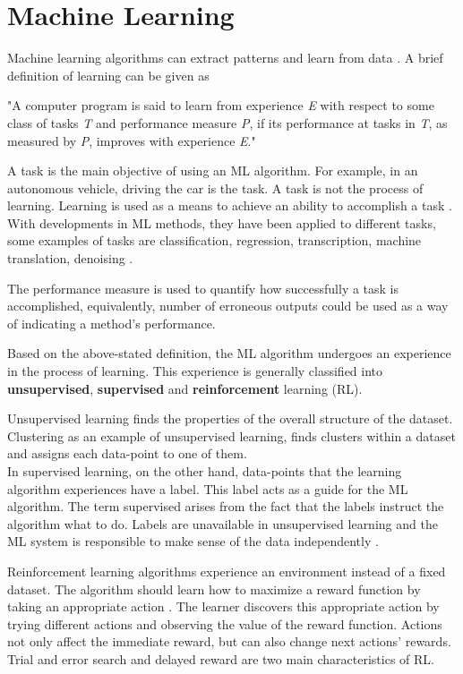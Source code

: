 \chapter{Machine Learning}
Machine learning algorithms can extract patterns and learn from data \cite{IanGoodfellow2016}. A brief definition of learning can be given as \cite{mitchell1997machine}
\begin{displayquote}[][]
    "A computer program is said to learn from experience \textit{E} with respect to some class of tasks \textit{T} and performance measure \textit{P}, if its performance at tasks in \textit{T}, as measured by \textit{P}, improves with experience \textit{E}."
\end{displayquote}

A task is the main objective of using an ML algorithm. For example, in an autonomous vehicle, driving the car is the task. A task is not the process of learning. Learning is used as a means to achieve an ability to accomplish a task \cite{IanGoodfellow2016}. With developments in ML methods, they have been applied to different tasks, some examples of tasks are classification, regression, transcription, machine translation, denoising \cite{IanGoodfellow2016}.

The performance measure is used to quantify how successfully a task is accomplished, equivalently, number of erroneous outputs could be used as a way of indicating a method's performance. 

Based on the above-stated definition, the ML algorithm undergoes an experience in the process of learning. This experience is generally classified into \textbf{unsupervised}, \textbf{supervised} and \textbf{reinforcement} learning (RL).

Unsupervised learning finds the properties of the overall structure of the dataset. Clustering as an example of unsupervised learning, finds clusters within a dataset and assigns each data-point to one of them.\\In supervised learning, on the other hand, data-points that the learning algorithm experiences have a label. This label acts as a guide for the ML algorithm. The term supervised arises from the fact that the labels instruct the algorithm what to do. Labels are unavailable in unsupervised learning and the ML system is responsible to make sense of the data independently \cite{IanGoodfellow2016}. 

Reinforcement learning algorithms experience an environment instead of a fixed dataset. The algorithm should learn how to maximize a reward function by taking an appropriate action \cite{sutton1992introduction}. The learner discovers this appropriate action by trying different actions and observing the value of the reward function. Actions not only affect the immediate reward, but can also change next actions' rewards. Trial and error search and delayed reward are two main characteristics of RL.
